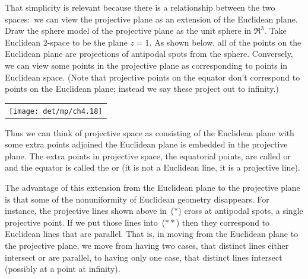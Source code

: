 That simplicity is relevant because there is a 
relationship between the two spaces:~we can view the 
projective plane as an extension of the Euclidean plane.
Draw the sphere model of the projective plane as the unit sphere in $\Re^3$.
Take Euclidean $2$-space to be the plane $z=1$.
As shown below, all of the points on the Euclidean plane are projections of  
antipodal spots from the sphere.
Conversely, we can view some points
in the projective plane as corresponding to points in Euclidean space.
(Note that projective points on the equator don't correspond to points on
the Euclidean plane; instead we say these project out to infinity.)
\begin{center}
 \hfill
  \begin{tabular}{@{}c@{}}\texttt{[image: det/mp/ch4.18]}\end{tabular}
 \hfill\llap{($**$)}
\end{center}
Thus we can think of projective space as consisting of the Euclidean plane 
with some extra points adjoined \Dash  
the Euclidean plane is embedded in the projective plane.
The extra points in projective space, the equatorial points,
are called %
or 
and the equator is called the 
%
 or 
(it is not a Euclidean line, it is a projective line). 

The advantage of this extension from the Euclidean plane 
to the projective plane
is that some of the nonuniformity 
of Euclidean geometry disappears.
For instance, the projective lines shown above in~($*$) cross
at antipodal spots, a single projective point.
If we put those lines into~($**$) then they correspond to Euclidean lines that
are parallel.
That is, in moving from the Euclidean plane to the projective plane, we move
from having two cases, 
that distinct lines either intersect or are parallel, to having only
one case, that distinct lines intersect (possibly at a point at infinity). 

